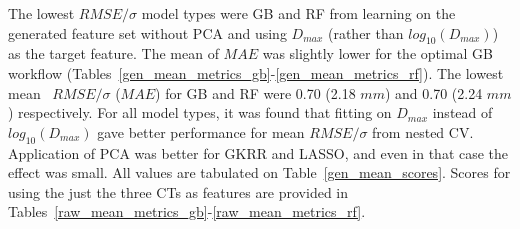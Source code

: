 \documentclass[11pt,a4paper]{article}
\begin{document}
\par
The lowest $RMSE/\sigma$ model types were GB and RF from learning on the generated feature set without PCA and using $D_{max}$ (rather than $log_{10}(D_{max})$) as the target feature. The mean of $MAE$ was slightly lower for the optimal GB workflow (Tables~\ref{gen_mean_metrics_gb}-\ref{gen_mean_metrics_rf}). The lowest mean ~$RMSE/\sigma$ ($MAE$) for GB and RF were 0.70 (2.18 $mm$) and 0.70 (2.24 $mm$) respectively. For all model types, it was found that fitting on $D_{max}$ instead of $log_{10}(D_{max})$ gave better performance for mean $RMSE/\sigma$ from nested CV. Application of PCA was better for GKRR and LASSO, and even in that case the effect was small. All values are tabulated on Table~\ref{gen_mean_scores}. Scores for using the just the three CTs as features are provided in Tables~\ref{raw_mean_metrics_gb}-\ref{raw_mean_metrics_rf}.
\end{document}

